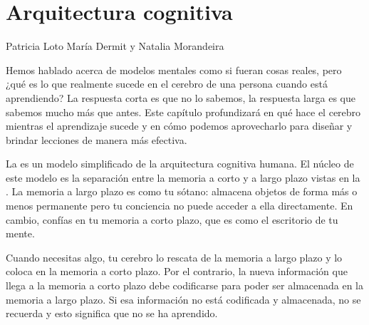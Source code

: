 \chapter{Arquitectura cognitiva}\label{s:architecture}

\begin{reviewer}
{Patricia Loto}
{María Dermit y Natalia Morandeira}
\end{reviewer}
 	
Hemos hablado acerca de modelos mentales como si fueran cosas reales,
pero ¿qué es lo que realmente sucede en el cerebro de una persona cuando está aprendiendo?
La respuesta corta es que no lo sabemos, la respuesta larga es que sabemos mucho más que antes.
Este capítulo profundizará en qué hace el cerebro mientras el aprendizaje sucede
y en cómo podemos aprovecharlo para diseñar y brindar lecciones de manera más efectiva.



La  es un modelo simplificado de la arquitectura cognitiva humana. 
El núcleo de este modelo es la separación entre la memoria a corto y a largo plazo vistas en la .
La memoria a largo plazo es como tu sótano:
almacena objetos de forma más o menos permanente
pero tu conciencia no puede acceder a ella directamente.
En cambio,
confías en tu memoria a corto plazo,
que es como el escritorio de tu mente.

Cuando necesitas algo,
tu cerebro lo rescata de la memoria a largo plazo  
y lo coloca en la memoria a corto plazo.
Por el contrario, la nueva información que llega a la memoria a corto plazo
debe codificarse para poder ser almacenada en la memoria a largo plazo.
Si esa información no está codificada y almacenada, no se recuerda y esto significa que  
no se ha aprendido.

